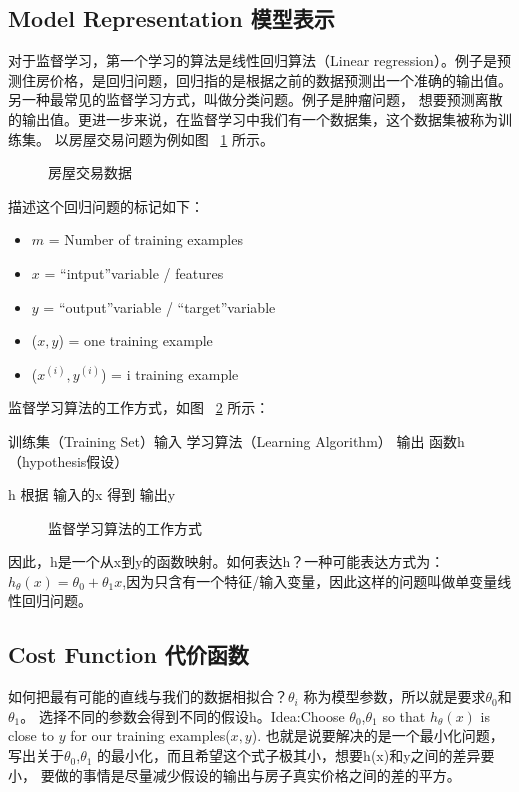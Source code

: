 \documentclass[UTF8]{ctexart}
\begin{document}
\subsection{Model Representation 模型表示}
对于监督学习，第一个学习的算法是线性回归算法（Linear regression）。例子是预测住房价格，是回归问题，回归指的是根据之前的数据预测出一个准确的输出值。另一种最常见的监督学习方式，叫做分类问题。例子是肿瘤问题，
想要预测离散的输出值。更进一步来说，在监督学习中我们有一个数据集，这个数据集被称为训练集。
以房屋交易问题为例如图 ~\ref{fig:2} 所示。
\begin{figure}[htb]
 \caption{房屋交易数据}
 \label{fig:2}
 \end{figure}

 描述这个回归问题的标记如下：
\begin{itemize}
  \item $m$ = Number of training examples
  \item $x$ = ``intput''variable / features
  \item $y$ = ``output''variable / ``target''variable
  \item ($x,y$) = one training example
  \item ($x^{(i)},y^{(i)}$) = i training example
\end{itemize}

监督学习算法的工作方式，如图 ~\ref{fig:1} 所示：

训练集（Training Set）输入 学习算法（Learning Algorithm） 输出  函数h（hypothesis假设）

h 根据 输入的x 得到 输出y

\begin{figure}[htb]
 \caption{监督学习算法的工作方式}
 \label{fig:1}
 \end{figure}

因此，h是一个从x到y的函数映射。如何表达h？一种可能表达方式为：$h_\theta(x)=\theta_0+\theta_1x$,因为只含有一个特征/输入变量，因此这样的问题叫做单变量线性回归问题。

\subsection{Cost Function 代价函数}
如何把最有可能的直线与我们的数据相拟合？$\theta_i$ 称为模型参数，所以就是要求$\theta_0$和$\theta_1$。
选择不同的参数会得到不同的假设h。Idea:Choose $\theta_0$,$\theta_1$ so that $h_\theta(x)$ is close to $y$ for our training examples($x,y$).
也就是说要解决的是一个最小化问题，写出关于$\theta_0$,$\theta_1$ 的最小化，而且希望这个式子极其小，想要h(x)和y之间的差异要小，
要做的事情是尽量减少假设的输出与房子真实价格之间的差的平方。
\end{document}

